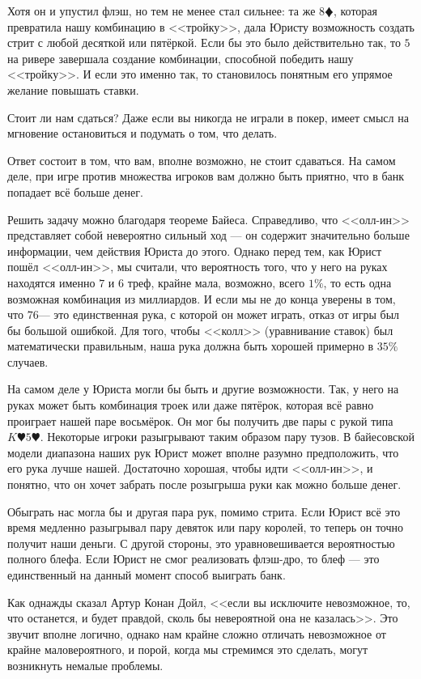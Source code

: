 \documentclass[12pt, a4paper, oneside]{extreport}
\theoremstyle{plain}              %
\theoremstyle{definition}         %
\begin{document}
Хотя он и упустил флэш, но тем не менее стал сильнее: та же $8\vardiamond$, которая превратила нашу комбинацию в <<тройку>>, дала Юристу возможность создать стрит с любой десяткой или пятёркой. Если бы это было действительно так, то $5$\spadesuit на ривере завершала создание комбинации, способной победить нашу <<тройку>>. И если это именно так, то становилось понятным его упрямое желание повышать ставки.

Стоит ли нам сдаться? Даже если вы никогда не играли в покер, имеет смысл на мгновение остановиться и подумать о том, что делать.

Ответ состоит в том, что вам, вполне возможно, не стоит сдаваться. На самом деле, при игре против множества игроков вам должно быть приятно, что в банк попадает всё больше денег.

Решить задачу можно благодаря теореме Байеса. Справедливо, что <<олл-ин>> представляет собой невероятно сильный ход --- он содержит значительно больше информации, чем действия Юриста до этого. Однако перед тем, как Юрист пошёл <<олл-ин>>, мы считали, что вероятность того, что у него на руках находятся именно $7$ и $6$ треф, крайне мала, возможно, всего $1\%$, то есть одна возможная комбинация из миллиардов. И если мы не до конца уверены в том, что $7$\clubsuit  $6$\clubsuit --- это единственная рука, с которой он может играть, отказ от игры был бы большой ошибкой. Для того, чтобы <<колл>> (уравнивание ставок) был математически правильным, наша рука должна быть хорошей примерно в $35\%$ случаев.

На самом деле у Юриста могли бы быть и другие возможности. Так, у него на руках может быть комбинация троек или даже пятёрок, которая всё равно проиграет нашей паре восьмёрок. Он мог бы получить две пары с рукой типа $K\varheart 5\varheart$. Некоторые игроки разыгрывают таким образом пару тузов. В байесовской модели диапазона наших рук Юрист может вполне разумно предположить, что его рука лучше нашей. Достаточно хорошая, чтобы идти <<олл-ин>>, и понятно, что он хочет забрать после розыгрыша руки как можно больше денег.

Обыграть нас могла бы и другая пара рук, помимо стрита. Если Юрист всё это время медленно разыгрывал пару девяток или пару королей, то теперь он точно получит наши деньги. С другой стороны, это уравновешивается вероятностью полного блефа. Если Юрист не смог реализовать флэш-дро, то блеф --- это единственный на данный момент способ выиграть банк.

Как однажды сказал Артур Конан Дойл, <<если вы исключите невозможное, то, что останется, и будет правдой, сколь бы невероятной она не казалась>>. Это звучит вполне логично, однако нам крайне сложно отличать невозможное от крайне маловероятного, и порой, когда мы стремимся это сделать, могут возникнуть немалые проблемы.
\end{document}
